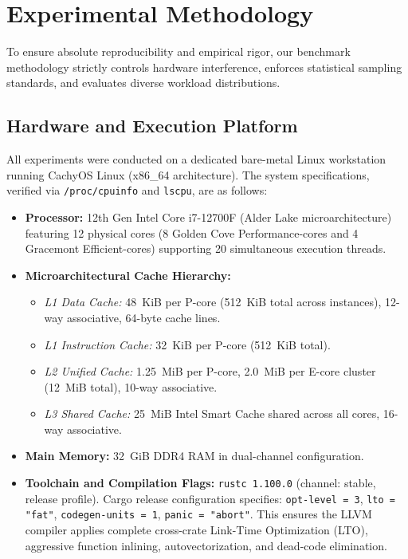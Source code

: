 \documentclass[conference]{IEEEtran}
\begin{document}
\section{Experimental Methodology}

To ensure absolute reproducibility and empirical rigor, our benchmark methodology strictly controls hardware interference, enforces statistical sampling standards, and evaluates diverse workload distributions.

\subsection{Hardware and Execution Platform}

All experiments were conducted on a dedicated bare-metal Linux workstation running CachyOS Linux (x86\_64 architecture). The system specifications, verified via \texttt{/proc/cpuinfo} and \texttt{lscpu}, are as follows:
\begin{itemize}
  \item \textbf{Processor:} 12th Gen Intel Core i7-12700F (Alder Lake microarchitecture) featuring 12 physical cores (8 Golden Cove Performance-cores and 4 Gracemont Efficient-cores) supporting 20 simultaneous execution threads.
  \item \textbf{Microarchitectural Cache Hierarchy:}
  \begin{itemize}
    \item \emph{L1 Data Cache:} 48~KiB per P-core (512~KiB total across instances), 12-way associative, 64-byte cache lines.
    \item \emph{L1 Instruction Cache:} 32~KiB per P-core (512~KiB total).
    \item \emph{L2 Unified Cache:} 1.25~MiB per P-core, 2.0~MiB per E-core cluster (12~MiB total), 10-way associative.
    \item \emph{L3 Shared Cache:} 25~MiB Intel Smart Cache shared across all cores, 16-way associative.
  \end{itemize}
  \item \textbf{Main Memory:} 32~GiB DDR4 RAM in dual-channel configuration.
  \item \textbf{Toolchain and Compilation Flags:} \texttt{rustc 1.100.0} (channel: stable, release profile). Cargo release configuration specifies: \texttt{opt-level = 3}, \texttt{lto = "fat"}, \texttt{codegen-units = 1}, \texttt{panic = "abort"}. This ensures the LLVM compiler applies complete cross-crate Link-Time Optimization (LTO), aggressive function inlining, autovectorization, and dead-code elimination.
\end{itemize}
\end{document}
